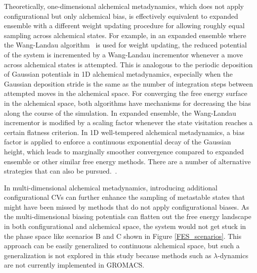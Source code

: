 \documentclass[journal=jacsat,manuscript=article]{achemso}
\begin{document}
Theoretically, one-dimensional alchemical metadynamics, which does not apply configurational but only alchemical bias, is effectively equivalent to expanded ensemble with a different weight updating procedure for allowing roughly equal sampling across alchemical states. For example, in an expanded ensemble where the Wang-Landau algorithm~\cite{desgranges2012evaluation, wang2001efficient, belardinelli2007fast} is used for weight updating, the reduced potential of the system is incremented by a Wang-Landau incrementor whenever a move across alchemical states is attempted. This is analogous to the periodic deposition of Gaussian potentials in 1D alchemical metadynamics, especially when the Gaussian deposition stride is the same as the number of integration steps between attempted moves in the alchemical space. For converging the free energy surface in the alchemical space, both algorithms have mechanisms for decreasing the bias along the course of the simulation. In expanded ensemble, the Wang-Landau incrementor is modified by a scaling factor whenever the state visitation reaches a certain flatness criterion. In 1D well-tempered alchemical metadynamics, a bias factor is applied to enforce a continuous exponential decay of the Gaussian height, which leads to marginally smoother convergence compared to expanded ensemble or other similar free energy methods. There are a number of  alternative strategies that can also be pursued.~\cite{dama2014transition}.

In multi-dimensional alchemical metadynamics, introducing additional configurational CVs can further enhance the sampling of metastable states that might have been missed by methods that do not apply configurational biases. As the multi-dimensional biasing potentials can flatten out the free energy landscape in both configurational and alchemical space, the system would not get stuck in the phase space like scenarios B and C shown in Figure \ref{FES_scenarios}. This approach can be easily generalized to continuous alchemical space, but such a generalization is not explored in this study because methods such as $\lambda$-dynamics are not currently implemented in GROMACS. 
\end{document}
